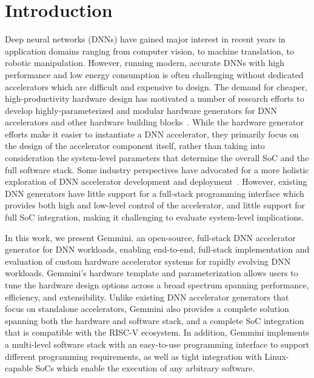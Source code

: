 \section{Introduction}

Deep neural networks (DNNs) have gained major interest in recent years in application domains ranging from computer vision, to machine translation, to robotic manipulation.
However, running modern, accurate DNNs with high performance and low energy consumption is often challenging without dedicated accelerators which are difficult and expensive to design.
The demand for cheaper, high-productivity hardware design has motivated a number
of research efforts to develop highly-parameterized and modular hardware
generators for DNN
accelerators and other hardware building blocks~\cite{moreau2018, venkatesan2019magnet,polysa,zhang2018,automated-systolic-cnn-fpgas,deepburning,hybrid-dnn}.
While the hardware generator efforts make it easier to instantiate a DNN accelerator,
they primarily focus on the design of the accelerator component itself, rather than taking into consideration the system-level parameters that determine the overall SoC and the full software stack.
Some industry perspectives have advocated for a more
holistic exploration of DNN accelerator development and deployment~\cite{datacenter-facebook,edge-facebook,ai-tax-hpca}.
However, existing DNN generators have little support for a full-stack programming interface which provides both high and low-level control of the accelerator, and little support for full SoC integration, making it challenging to evaluate system-level implications. 

In this work, we present Gemmini, an open-source, full-stack DNN accelerator
generator for DNN workloads, enabling end-to-end, full-stack implementation and evaluation
of custom hardware accelerator systems for rapidly evolving DNN workloads.
Gemmini's hardware template and parameterization allows users to tune the
hardware design options across a broad spectrum spanning performance, efficiency,
and extensibility.
Unlike existing DNN accelerator generators that focus on standalone accelerators, Gemmini also provides a complete solution spanning both the hardware and software stack, and a complete SoC integration that is compatible with the RISC-V ecosystem.
In addition, Gemmini implements a multi-level software stack with an easy-to-use programming interface to support different programming requirements, as well as tight integration with Linux-capable SoCs which enable the execution of any arbitrary software.

